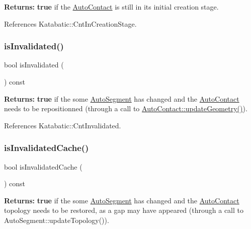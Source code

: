 {\bfseries Returns\+:} {\bfseries true} if the \hyperlink{classKatabatic_1_1AutoContact}{Auto\+Contact} is still in it\textquotesingle{}s initial creation stage. 

References Katabatic\+::\+Cnt\+In\+Creation\+Stage.

\mbox{\label{classKatabatic_1_1AutoContact_ac540608485240ff88970131ebc02c1ab}} 
\subsubsection{\texorpdfstring{is\+Invalidated()}{isInvalidated()}}
{\footnotesize\ttfamily bool is\+Invalidated (\begin{DoxyParamCaption}{ }\end{DoxyParamCaption}) const\hspace{0.3cm}{\ttfamily [inline]}}

{\bfseries Returns\+:} {\bfseries true} if the some \hyperlink{classKatabatic_1_1AutoSegment}{Auto\+Segment} has changed and the \hyperlink{classKatabatic_1_1AutoContact}{Auto\+Contact} needs to be repositionned (through a call to \hyperlink{classKatabatic_1_1AutoContact_af6a2454547eeb7f5a519970dcb467e90}{Auto\+Contact\+::update\+Geometry()}). 

References Katabatic\+::\+Cnt\+Invalidated.

\mbox{\label{classKatabatic_1_1AutoContact_a6d1120fc8800af5d269e72ce5c3ba629}} 
\subsubsection{\texorpdfstring{is\+Invalidated\+Cache()}{isInvalidatedCache()}}
{\footnotesize\ttfamily bool is\+Invalidated\+Cache (\begin{DoxyParamCaption}{ }\end{DoxyParamCaption}) const\hspace{0.3cm}{\ttfamily [inline]}}

{\bfseries Returns\+:} {\bfseries true} if the some \hyperlink{classKatabatic_1_1AutoSegment}{Auto\+Segment} has changed and the \hyperlink{classKatabatic_1_1AutoContact}{Auto\+Contact} topology needs to be restored, as a gap may have appeared (through a call to Auto\+Segment\+::update\+Topology()). 

